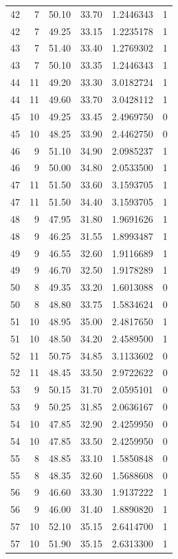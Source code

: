 \documentclass[
  letterpaper,
  DIV=11,
  numbers=noendperiod]{scrreprt}
\renewcommand{\[}{\begin{equation}}
\renewcommand{\]}{\end{equation}}
\begin{document}
\begin{table}
\begin{tabular*}{\linewidth}{@{\extracolsep{\fill}}rrrrrr}
42 & 7 & 50.10 & 33.70 & 1.2446343 & 1 \\ 
42 & 7 & 49.25 & 33.15 & 1.2235178 & 1 \\ 
43 & 7 & 51.40 & 33.40 & 1.2769302 & 1 \\ 
43 & 7 & 50.10 & 33.35 & 1.2446343 & 1 \\ 
44 & 11 & 49.20 & 33.30 & 3.0182724 & 1 \\ 
44 & 11 & 49.60 & 33.70 & 3.0428112 & 1 \\ 
45 & 10 & 49.25 & 33.45 & 2.4969750 & 0 \\ 
45 & 10 & 48.25 & 33.90 & 2.4462750 & 0 \\ 
46 & 9 & 51.10 & 34.90 & 2.0985237 & 1 \\ 
46 & 9 & 50.00 & 34.80 & 2.0533500 & 1 \\ 
47 & 11 & 51.50 & 33.60 & 3.1593705 & 1 \\ 
47 & 11 & 51.50 & 34.40 & 3.1593705 & 1 \\ 
48 & 9 & 47.95 & 31.80 & 1.9691626 & 1 \\ 
48 & 9 & 46.25 & 31.55 & 1.8993487 & 1 \\ 
49 & 9 & 46.55 & 32.60 & 1.9116689 & 1 \\ 
49 & 9 & 46.70 & 32.50 & 1.9178289 & 1 \\ 
50 & 8 & 49.35 & 33.20 & 1.6013088 & 0 \\ 
50 & 8 & 48.80 & 33.75 & 1.5834624 & 0 \\ 
51 & 10 & 48.95 & 35.00 & 2.4817650 & 1 \\ 
51 & 10 & 48.50 & 34.20 & 2.4589500 & 1 \\ 
52 & 11 & 50.75 & 34.85 & 3.1133602 & 0 \\ 
52 & 11 & 48.45 & 33.50 & 2.9722622 & 0 \\ 
53 & 9 & 50.15 & 31.70 & 2.0595101 & 0 \\ 
53 & 9 & 50.25 & 31.85 & 2.0636167 & 0 \\ 
54 & 10 & 47.85 & 32.90 & 2.4259950 & 0 \\ 
54 & 10 & 47.85 & 33.50 & 2.4259950 & 0 \\ 
55 & 8 & 48.85 & 33.10 & 1.5850848 & 0 \\ 
55 & 8 & 48.35 & 32.60 & 1.5688608 & 0 \\ 
56 & 9 & 46.60 & 33.30 & 1.9137222 & 1 \\ 
56 & 9 & 46.00 & 31.40 & 1.8890820 & 1 \\ 
57 & 10 & 52.10 & 35.15 & 2.6414700 & 1 \\ 
57 & 10 & 51.90 & 35.15 & 2.6313300 & 1 \\ 

\end{tabular*}
\end{table}
\end{document}
